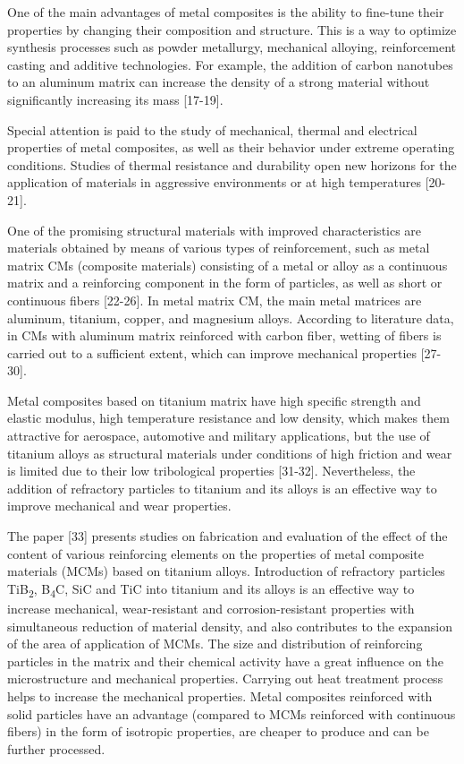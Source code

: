 One of the main advantages of metal composites is the ability to
fine-tune their properties by changing their composition and structure.
This is a way to optimize synthesis processes such as powder metallurgy,
mechanical alloying, reinforcement casting and additive technologies.
For example, the addition of carbon nanotubes to an aluminum matrix can
increase the density of a strong material without significantly
increasing its mass {[}17-19{]}.

Special attention is paid to the study of mechanical, thermal and
electrical properties of metal composites, as well as their behavior
under extreme operating conditions. Studies of thermal resistance and
durability open new horizons for the application of materials in
aggressive environments or at high temperatures {[}20-21{]}.

One of the promising structural materials with improved characteristics
are materials obtained by means of various types of reinforcement, such
as metal matrix CMs (composite materials) consisting of a metal or alloy
as a continuous matrix and a reinforcing component in the form of
particles, as well as short or continuous fibers {[}22-26{]}. In metal
matrix CM, the main metal matrices are aluminum, titanium, copper, and
magnesium alloys. According to literature data, in CMs with aluminum
matrix reinforced with carbon fiber, wetting of fibers is carried out to
a sufficient extent, which can improve mechanical properties
{[}27-30{]}.

Metal composites based on titanium matrix have high specific strength
and elastic modulus, high temperature resistance and low density, which
makes them attractive for aerospace, automotive and military
applications, but the use of titanium alloys as structural materials
under conditions of high friction and wear is limited due to their low
tribological properties {[}31-32{]}. Nevertheless, the addition of
refractory particles to titanium and its alloys is an effective way to
improve mechanical and wear properties.

The paper {[}33{]} presents studies on fabrication and evaluation of the
effect of the content of various reinforcing elements on the properties
of metal composite materials (MCMs) based on titanium alloys.
Introduction of refractory particles TiB\textsubscript{2},
B\textsubscript{4}C, SiC and TiC into titanium and its alloys is an
effective way to increase mechanical, wear-resistant and
corrosion-resistant properties with simultaneous reduction of material
density, and also contributes to the expansion of the area of
application of MCMs. The size and distribution of reinforcing particles
in the matrix and their chemical activity have a great influence on the
microstructure and mechanical properties. Carrying out heat treatment
process helps to increase the mechanical properties. Metal composites
reinforced with solid particles have an advantage (compared to MCMs
reinforced with continuous fibers) in the form of isotropic properties,
are cheaper to produce and can be further processed.

